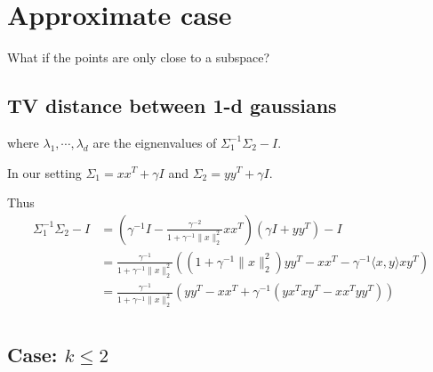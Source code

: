 \section{Approximate case}

What if the points are only close to a subspace?

\subsection{TV distance between 1-d gaussians}
where $\lambda_1, \cdots, \lambda_d$ are the eignenvalues of $\Sigma_1^{-1} \Sigma_2 - I$.

In our setting $\Sigma_1 = xx^T + \gamma I$ and $\Sigma_2 = yy^T + \gamma I$.

Thus 
\begin{align*}
    \Sigma_1^{-1} \Sigma_2 - I &= \left( \gamma^{-1} I - \frac{\gamma^{-2}}{1 + \gamma^{-1} \|x\|_2^2} xx^T \right) \left( \gamma I + yy^T \right) - I\\
    &=\frac{\gamma^{-1}}{1 + \gamma^{-1} \|x\|_2^2} \left( (1 + \gamma^{-1} \|x\|_2^2)yy^T -  xx^T - \gamma^{-1} \langle x, y\rangle xy^T \right)\\
    &=\frac{\gamma^{-1}}{1 + \gamma^{-1} \|x\|_2^2} \left( yy^T -  xx^T + \gamma^{-1} \left( y x^Tx y^T - x x^Ty y^T\right)\right)\\
\end{align*}

\subsection{Case: $k\leq2$}

